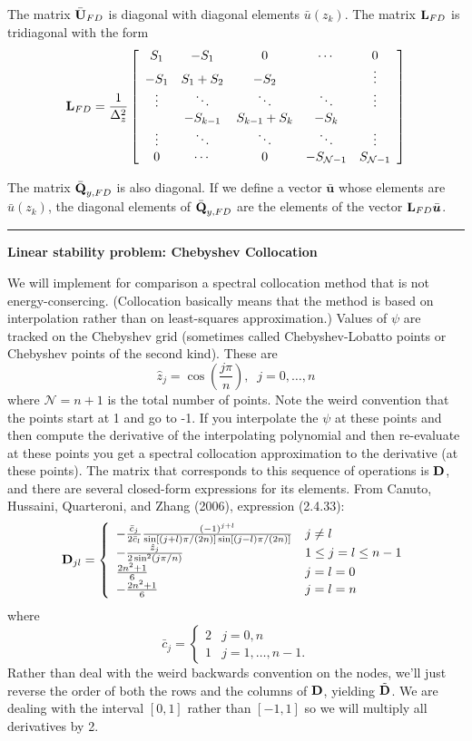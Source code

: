 \documentclass[10pt]{article}
\newcommand{\sN}{\mathcal{N}}
\newcommand{\mat}[1]{\text{\bf #1}}
\begin{document}
The matrix $\bar{\mat{U}}_{FD}$ is diagonal with diagonal elements $\bar u(z_k)$.
The matrix $\mat{L}_{FD}$ is tridiagonal with the form
\[\mat{L}_{FD} = \frac{1}{\Delta_z^2}\left[\begin{array}{ccccc}
S_1&-S_1&0&\cdots&0\\
-S_1&S_1+S_2&-S_2&&\vdots\\
\vdots&\ddots&\ddots&\ddots&\vdots\\
&-S_{k-1}&S_{k-1}+S_k&-S_k&\\
\vdots&\ddots&\ddots&\ddots&\vdots\\
0&\cdots&0&-S_{\sN-1}&S_{\sN-1}
\end{array}\right]\]

The matrix $\bar{\mat{Q}}_{y,FD}$ is also diagonal.
If we define a vector $\bar{\bm{u}}$ whose elements are $\bar u(z_k)$, the diagonal elements of $\bar{\mat{Q}}_{y,FD}$ are the elements of the vector $\mat{L}_{FD}\bar{\bm{u}}$.\\

\hrule
\begin{center}{\bf Linear stability problem: Chebyshev Collocation}\end{center}
We will implement for comparison a spectral collocation method that is not energy-consercing. 
(Collocation basically means that the method is based on interpolation rather than on least-squares approximation.)
Values of $\psi$ are tracked on the Chebyshev grid (sometimes called Chebyshev-Lobatto points or Chebyshev points of the second kind).
These are
\[\hat{z}_j = \cos\left(\frac{j\pi}{n}\right),\;\;j=0,\ldots,n\]
where $\sN=n+1$ is the total number of points.
Note the weird convention that the points start at 1 and go to -1.
If you interpolate the $\psi$ at these points and then compute the derivative of the interpolating polynomial and then re-evaluate at these points you get a spectral collocation approximation to the derivative (at these points).
The matrix that corresponds to this sequence of operations is $\mat{D}$, and there are several closed-form expressions for its elements.
From Canuto, Hussaini, Quarteroni, and Zhang (2006), expression (2.4.33):
\[\mat{D}_{jl} = \left\{\begin{array}{ll}
-\frac{\bar{c}_j}{2\bar{c}_l}\frac{(-1)^{j+l}}{\sin[(j+l)\pi/(2n)]\sin[(j-l)\pi/(2n)]}&j\neq l\\
-\frac{\hat{z}_j}{2\sin^2(j\pi/n)}&1\le j=l\le n-1\\
\frac{2n^2+1}{6}&j=l=0\\
-\frac{2n^2+1}{6}&j=l=n
\end{array}\right.\]
where
\[\bar{c}_j = \left\{\begin{array}{ll}
2&j=0,n\\
1&j=1,\ldots,n-1.\end{array}\right.\]
Rather than deal with the weird backwards convention on the nodes, we'll just reverse the order of both the rows and the columns of $\mat{D}$, yielding $\tilde{\mat{D}}$.
We are dealing with the interval $[0,1]$ rather than $[-1,1]$ so we will multiply all derivatives by 2.
\end{document}
